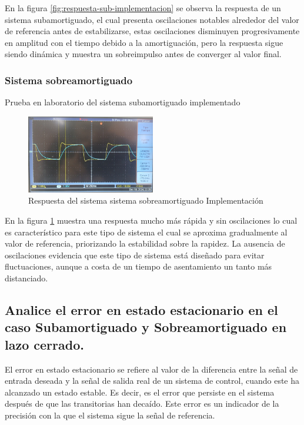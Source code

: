 \documentclass[conference]{IEEEtran}
\begin{document}
	 En la figura \ref{fig:respuesta-sub-implementacion} se observa la respuesta de un sistema subamortiguado, el cual presenta oscilaciones notables alrededor del valor de referencia antes de estabilizarse, estas oscilaciones disminuyen progresivamente en amplitud con el tiempo debido a la amortiguación, pero la respuesta sigue siendo dinámica y muestra un sobreimpulso antes de converger al valor final.
	 
	 \subsubsection{\textbf{Sistema sobreamortiguado}}
	 Prueba en laboratorio del sistema subamortiguado implementado
	 \begin{figure}[h]
	 	\centering
	 	\includegraphics[width=0.5\textwidth]{media/respuesta-sobre-implementacion}
	 	\caption{Respuesta del sistema sistema sobreamortiguado Implementación}
	 	\label{fig:respuesta-sobre-implementacion}
	 \end{figure}
	 
	 En la figura \ref{fig:respuesta-sobre-implementacion} muestra una respuesta mucho más rápida y sin oscilaciones lo cual es característico para este tipo de sistema el cual se aproxima gradualmente al valor de referencia, priorizando la estabilidad sobre la rapidez. La ausencia de oscilaciones evidencia que este tipo de sistema está diseñado para evitar fluctuaciones, aunque a costa de un tiempo de asentamiento un tanto más distanciado.	 
	 
	
	 \subsection{\textbf{Analice el error en estado estacionario en el caso Subamortiguado y Sobreamortiguado en lazo cerrado.}}
	 
	 El error en estado estacionario se refiere al valor de la diferencia entre la señal de entrada deseada y la señal de salida real de un sistema de control, cuando este ha alcanzado un estado estable. Es decir, es el error que persiste en el sistema después de que las transitorias han decaído. Este error es un indicador de la precisión con la que el sistema sigue la señal de referencia.
	 
\end{document}
